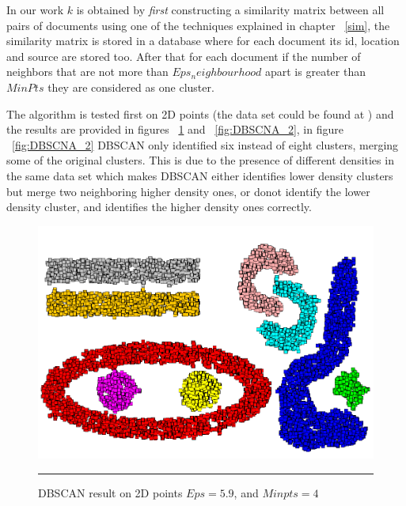 In our work $k$ is obtained by \textit{first} constructing a similarity matrix between all pairs of documents using one of the techniques explained in chapter ~\ref{sim}, the similarity matrix is stored in a database where for each document its id, location and source are stored too. After that for each document if the number of neighbors  that are not more than $Eps_neighbourhood$ apart is greater than $MinPts$ they are considered as one cluster.

The algorithm is tested first on 2D points (the data set could be found at \citep{Mitosis_2}) and the results are provided in figures ~\ref{fig:DBSCNA_1} and ~\ref{fig:DBSCNA_2}, in figure ~\ref{fig:DBSCNA_2} DBSCAN only identified six instead of eight clusters, merging some of the original clusters. This is
due to the presence of different densities in the same data set which makes DBSCAN either identifies lower density clusters but merge two
neighboring higher density ones, or donot identify the lower density cluster, and identifies the higher density ones correctly.

\begin{figure}[htbp]
	\centering
		\includegraphics{./Figures/DBSCAN_1.png}
		\rule{25em}{0.3pt}
	\caption[DBSCAN result on 2D points $Eps = 5.9$, and $Minpts = 4$]{DBSCAN result on 2D points $Eps = 5.9$, and $Minpts = 4$}
	\label{fig:DBSCNA_1}
\end{figure}

